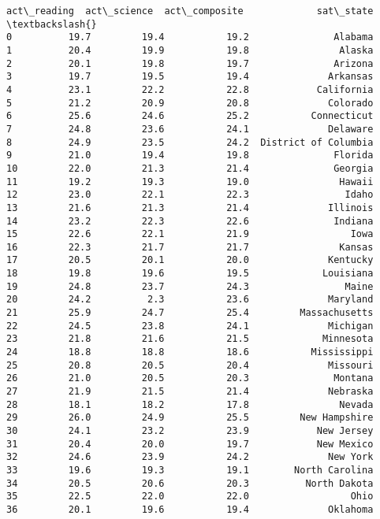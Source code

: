 \documentclass[11pt]{article}
\begin{document}
\begin{Verbatim}[commandchars=\\\{\}]
    act\_reading  act\_science  act\_composite             sat\_state  \textbackslash{}
0          19.7         19.4           19.2               Alabama   
1          20.4         19.9           19.8                Alaska   
2          20.1         19.8           19.7               Arizona   
3          19.7         19.5           19.4              Arkansas   
4          23.1         22.2           22.8            California   
5          21.2         20.9           20.8              Colorado   
6          25.6         24.6           25.2           Connecticut   
7          24.8         23.6           24.1              Delaware   
8          24.9         23.5           24.2  District of Columbia   
9          21.0         19.4           19.8               Florida   
10         22.0         21.3           21.4               Georgia   
11         19.2         19.3           19.0                Hawaii   
12         23.0         22.1           22.3                 Idaho   
13         21.6         21.3           21.4              Illinois   
14         23.2         22.3           22.6               Indiana   
15         22.6         22.1           21.9                  Iowa   
16         22.3         21.7           21.7                Kansas   
17         20.5         20.1           20.0              Kentucky   
18         19.8         19.6           19.5             Louisiana   
19         24.8         23.7           24.3                 Maine   
20         24.2          2.3           23.6              Maryland   
21         25.9         24.7           25.4         Massachusetts   
22         24.5         23.8           24.1              Michigan   
23         21.8         21.6           21.5             Minnesota   
24         18.8         18.8           18.6           Mississippi   
25         20.8         20.5           20.4              Missouri   
26         21.0         20.5           20.3               Montana   
27         21.9         21.5           21.4              Nebraska   
28         18.1         18.2           17.8                Nevada   
29         26.0         24.9           25.5         New Hampshire   
30         24.1         23.2           23.9            New Jersey   
31         20.4         20.0           19.7            New Mexico   
32         24.6         23.9           24.2              New York   
33         19.6         19.3           19.1        North Carolina   
34         20.5         20.6           20.3          North Dakota   
35         22.5         22.0           22.0                  Ohio   
36         20.1         19.6           19.4              Oklahoma   

\end{Verbatim}
\end{document}
